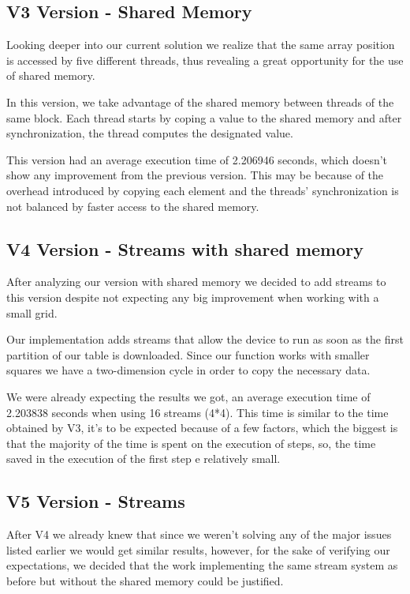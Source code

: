 \documentclass[conference]{IEEEtran}
\begin{document}


\subsection{V3 Version - Shared Memory}
Looking deeper into our current solution we realize that the same array position is accessed by five different threads, thus revealing a great opportunity for the use of shared memory.

In this version, we take advantage of the shared memory between threads of the same block. Each thread starts by coping a value to the shared memory and after synchronization, the thread computes the designated value.

This version had an average execution time of 2.206946 seconds, which doesn't show any improvement from the previous version. This may be because of the overhead introduced by copying each element and the threads' synchronization is not balanced by faster access to the shared memory.


\subsection{V4 Version - Streams with shared memory}
After analyzing our version with shared memory we decided to add streams to this version despite not expecting any big improvement when working with a small grid.

Our implementation adds streams that allow the device to run as soon as the first partition of our table is downloaded. Since our function works with smaller squares we have a two-dimension cycle in order to copy the necessary data.

We were already expecting the results we got, an average execution time of 2.203838 seconds when using 16 streams (4*4). This time is similar to the time obtained by V3, it's to be expected because of a few factors, which the biggest is that the majority of the time is spent on the execution of steps, so, the time saved in the execution of the first step e relatively small.


\subsection{V5 Version - Streams}
After V4 we already knew that since we weren't solving any of the major issues listed earlier we would get similar results, however, for the sake of verifying our expectations, we decided that the work implementing the same stream system as before but without the shared memory could be justified.
\end{document}
